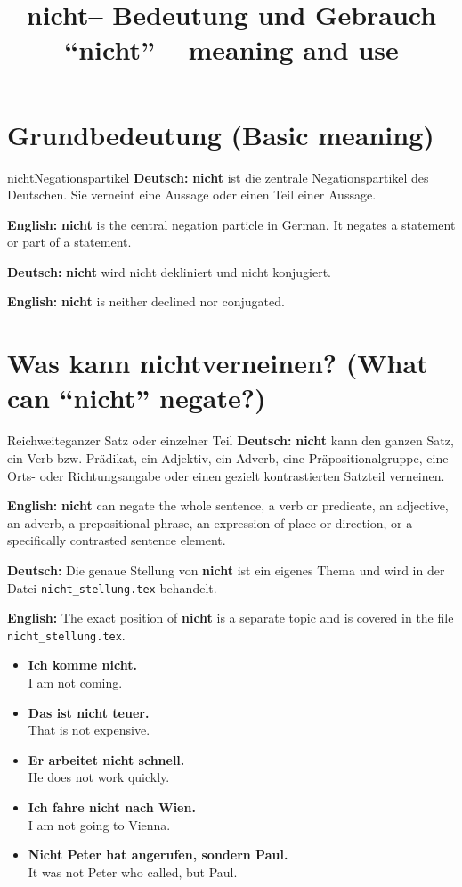 \documentclass[a4paper,11pt]{article}
\title{\glqq nicht\grqq -- Bedeutung und Gebrauch\\{\large\textnormal{``nicht'' -- meaning and use}}}
\date{}
\newcommand{\GermanText}[1]{\textbf{Deutsch: }#1\par}
\newcommand{\EnglishText}[1]{{\small\color{SoftGray}\textbf{English: }#1\par}}
\newcommand{\ExampleItem}[2]{\item \textbf{#1}\\{\small\color{SoftGray}#2}}
\begin{document}
\maketitle
\tableofcontents
\newpage

\section{Grundbedeutung \textnormal{(Basic meaning)}}
\begin{grammarentry}{nicht}{Negationspartikel}
\GermanText{\textbf{nicht} ist die zentrale Negationspartikel des Deutschen. Sie verneint eine Aussage oder einen Teil einer Aussage.}
\EnglishText{\textbf{nicht} is the central negation particle in German. It negates a statement or part of a statement.}
\GermanText{\textbf{nicht} wird nicht dekliniert und nicht konjugiert.}
\EnglishText{\textbf{nicht} is neither declined nor conjugated.}
\end{grammarentry}

\section{Was kann \glqq nicht\grqq verneinen? \textnormal{(What can ``nicht'' negate?)}}
\begin{grammarentry}{Reichweite}{ganzer Satz oder einzelner Teil}
\GermanText{\textbf{nicht} kann den ganzen Satz, ein Verb bzw. Prädikat, ein Adjektiv, ein Adverb, eine Präpositionalgruppe, eine Orts- oder Richtungsangabe oder einen gezielt kontrastierten Satzteil verneinen.}
\EnglishText{\textbf{nicht} can negate the whole sentence, a verb or predicate, an adjective, an adverb, a prepositional phrase, an expression of place or direction, or a specifically contrasted sentence element.}
\GermanText{Die genaue Stellung von \textbf{nicht} ist ein eigenes Thema und wird in der Datei \texttt{nicht\_stellung.tex} behandelt.}
\EnglishText{The exact position of \textbf{nicht} is a separate topic and is covered in the file \texttt{nicht\_stellung.tex}.}
\end{grammarentry}
\begin{exbox}\begin{itemize}
\ExampleItem{Ich komme nicht.}{I am not coming.}
\ExampleItem{Das ist nicht teuer.}{That is not expensive.}
\ExampleItem{Er arbeitet nicht schnell.}{He does not work quickly.}
\ExampleItem{Ich fahre nicht nach Wien.}{I am not going to Vienna.}
\ExampleItem{Nicht Peter hat angerufen, sondern Paul.}{It was not Peter who called, but Paul.}
\end{itemize}\end{exbox}
\end{document}
